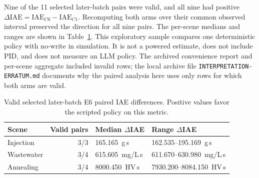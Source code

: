 \documentclass[10pt]{article}
\begin{document}
Nine of the 11 selected later-batch pairs were valid, and all nine had positive $\Delta\mathrm{IAE}=\mathrm{IAE}_{C0}-\mathrm{IAE}_{C1}$. Recomputing both arms over their common observed interval preserved the direction for all nine pairs. The per-scene medians and ranges are shown in Table~\ref{tab:s7-e6}. This exploratory sample compares one deterministic policy with no-write in simulation. It is not a powered estimate, does not include PID, and does not measure an LLM policy. The archived convenience report and per-scene aggregate included invalid rows; the local archive file \texttt{INTERPRETATION-ERRATUM.md} documents why the paired analysis here uses only rows for which both arms are valid.

\begin{table}[htbp]
\centering
\caption{Valid selected later-batch E6 paired IAE differences. Positive values favor the scripted policy on this metric.}
\label{tab:s7-e6}
\footnotesize
\begin{tabularx}{\textwidth}{@{}l r X X@{}}
\toprule
Scene & Valid pairs & Median $\Delta$IAE & Range $\Delta$IAE \\
\midrule
Injection & 3/3 & 165.165~g\,s & 162.535--195.169~g\,s \\
Wastewater & 3/4 & 615.605~mg/L\,s & 611.670--630.980~mg/L\,s \\
Annealing & 3/4 & 8000.450~HV\,s & 7930.200--8084.150~HV\,s \\
\bottomrule
\end{tabularx}
\end{table}
\end{document}
